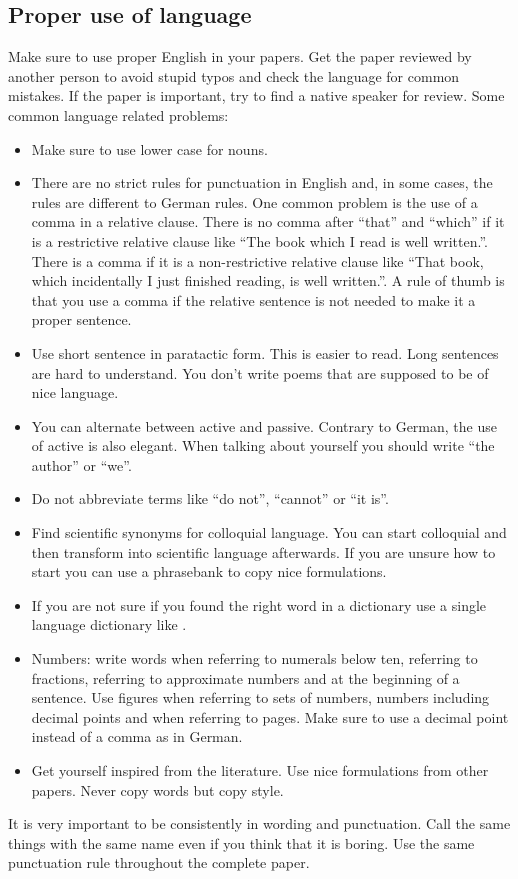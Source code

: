\subsection{Proper use of language}
Make sure to use proper English in your papers. Get the paper reviewed by another person to avoid stupid typos and check the language for common mistakes. If the paper is important, try to find a native speaker for review. Some common language related problems:
\begin{itemize}
\item Make sure to use lower case for nouns.
\item There are no strict rules for punctuation in English and, in some cases, the rules are different to German rules. One common problem is the use of a comma in a relative clause. There is no comma after ``that'' and ``which'' if it is a restrictive relative clause like ``The book which I read is well written.''. There is a comma if it is a non-restrictive relative clause like ``That book, which incidentally I just finished reading, is well written.''. A rule of thumb is that you use a comma if the relative sentence is not needed to make it a proper sentence.
\item Use short sentence in paratactic form. This is easier to read. Long sentences are hard to understand. You don't write poems that are supposed to be of nice language.
\item You can alternate between active and passive. Contrary to German, the use of active is also elegant. When talking about yourself you should write ``the author'' or ``we''. 
\item Do not abbreviate terms like ``do not'', ``cannot'' or ``it is''.
\item Find scientific synonyms for colloquial language. You can start colloquial and then transform into scientific language afterwards. If you are unsure how to start you can use a phrasebank \cite{Phrasebank} to copy nice formulations.
\item If you are not sure if you found the right word in a dictionary use a single language dictionary like \cite{Weblink}.
\item Numbers: write words when referring to numerals below ten, referring to fractions, referring to approximate numbers and at the beginning of a sentence. Use figures when referring to sets of numbers, numbers including decimal points and when referring to pages. Make sure to use a decimal point instead of a comma as in German. 
\item	Get yourself inspired from the literature. Use nice formulations from other papers. Never copy words but copy style.  
\end{itemize} 
It is very important to be consistently in wording and punctuation. Call the same things with the same name even if you think that it is boring. Use the same punctuation rule throughout the complete paper. 

